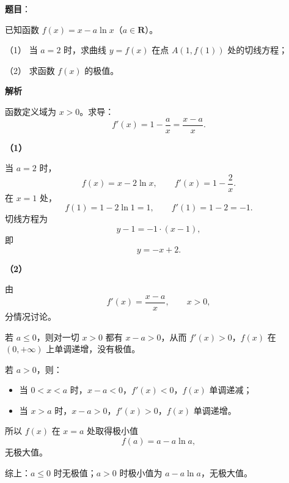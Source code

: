 \begin{answer}

\textbf{题目}：

已知函数 $f(x)=x-a\ln x$（$a\in\mathbf R$）。

（1） 当 $a=2$ 时，求曲线 $y=f(x)$ 在点 $A(1,f(1))$ 处的切线方程；

（2） 求函数 $f(x)$ 的极值。

\textbf{解析}

函数定义域为 $x>0$。求导：
\nopagebreak[4]
\[f'(x)=1-\frac ax=\frac{x-a}{x}.\]

\textbf{（1）}

当 $a=2$ 时，
\nopagebreak[4]
\[f(x)=x-2\ln x,\qquad f'(x)=1-\frac2x.\]
在 $x=1$ 处，
\nopagebreak[4]
\[f(1)=1-2\ln1=1,\qquad f'(1)=1-2=-1.\]
切线方程为
\nopagebreak[4]
\[y-1=-1\cdot(x-1),\]
即
\nopagebreak[4]
\[y=-x+2.\]

\textbf{（2）}

由
\nopagebreak[4]
\[f'(x)=\frac{x-a}{x},\qquad x>0,\]
分情况讨论。

若 $a\leqslant0$，则对一切 $x>0$ 都有 $x-a>0$，从而 $f'(x)>0$，$f(x)$ 在 $(0,+\infty)$ 上单调递增，没有极值。

若 $a>0$，则：

\begin{itemize}
\item 当 $0<x<a$ 时，$x-a<0$，$f'(x)<0$，$f(x)$ 单调递减；
\item 当 $x>a$ 时，$x-a>0$，$f'(x)>0$，$f(x)$ 单调递增。
\end{itemize}

所以 $f(x)$ 在 $x=a$ 处取得极小值
\nopagebreak[4]
\[f(a)=a-a\ln a,\]
无极大值。

综上：$a\leqslant0$ 时无极值；$a>0$ 时极小值为 $a-a\ln a$，无极大值。



\end{answer}
